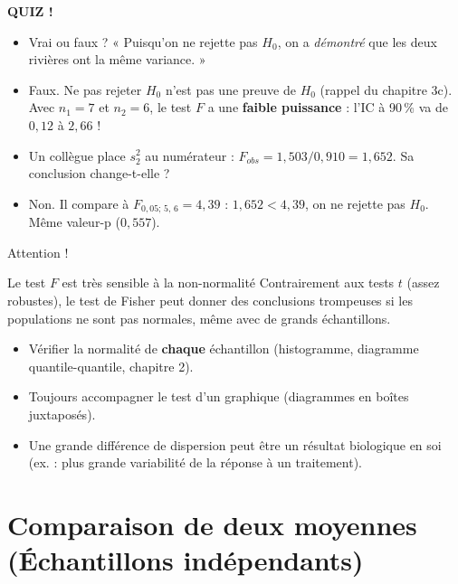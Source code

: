 \documentclass{BeamerTemplate}
\begin{document}
\begin{frame}[plain,t]
  \centerline{\LARGE\bfseries\alert{QUIZ !}}

  \medskip
  \begin{itemize}\itemsep 0.7cm
    \item Vrai ou faux ? « Puisqu'on ne rejette pas $H_0$, on a \emph{démontré} que les deux rivières ont la même variance. »
    \item<2-> \alert{Faux.} Ne pas rejeter $H_0$ n'est pas une preuve de $H_0$ (rappel du chapitre 3c). Avec $n_1 = 7$ et $n_2 = 6$, le test $F$ a une \textbf{faible puissance} : l'IC à 90\,\% va de $0{,}12$ à $2{,}66$ !
    \item Un collègue place $s_2^2$ au numérateur : $F_{obs} = 1{,}503 / 0{,}910 = 1{,}652$. Sa conclusion change-t-elle ?
    \item<2-> \alert{Non.} Il compare à $F_{0{,}05;\,5,\,6} = 4{,}39$ : $1{,}652 < 4{,}39$, on ne rejette pas $H_0$. Même valeur-p ($0{,}557$).
  \end{itemize}
\end{frame}

\begin{frame}[t]{Attention !}
  \begin{Boite}{Le test $F$ est très sensible à la non-normalité}
    Contrairement aux tests $t$ (assez robustes), le test de Fisher peut donner des conclusions trompeuses si les populations ne sont \alert{pas normales}, même avec de grands échantillons.
  \end{Boite}

  \bigskip
  \begin{itemize}\itemsep 3mm
    \item Vérifier la normalité de \textbf{chaque} échantillon (histogramme, diagramme quantile-quantile, chapitre 2).
    \item Toujours accompagner le test d'un graphique (diagrammes en boîtes juxtaposés).
    \item Une grande différence de dispersion peut être un \alert{résultat biologique} en soi (ex. : plus grande variabilité de la réponse à un traitement).
  \end{itemize}
\end{frame}

\section{Comparaison de deux moyennes (Échantillons indépendants)}
\end{document}
